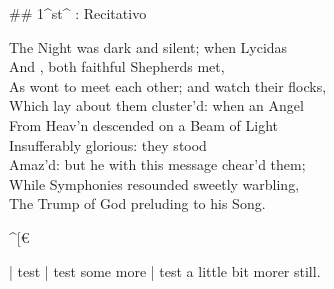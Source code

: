\newpage
{}

## 1^st^ \mvmt: Recitativo

\begin{ledgroup}
\beginnumbering
\pstart
The Night was dark and silent; when Lycidas  \\
And , both faithful Shepherds met,  \\
As wont to meet each other; and watch their flocks,  \\
Which lay about them cluster’d: when an Angel  \\
From Heav’n descended on a Beam of Light  \\
Insufferably glorious: they stood  \\
Amaz’d: but he with this message chear’d them;  \\
While Symphonies resounded sweetly warbling,  \\
The Trump of God preluding to his Song.
\pend
\endnumbering
\end{ledgroup}

^[€

| test
| test some more
| test a little bit morer still.

